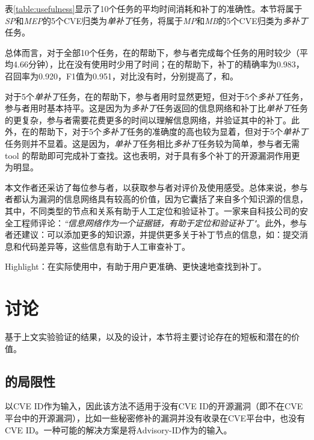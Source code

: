 表\ref{table:usefulness}显示了10个任务的平均时间消耗和补丁的准确性。本节将属于\textit{SP}和\textit{MEP}的5个CVE归类为\textit{单补丁}任务，将属于\textit{MP}和\textit{MB}的5个CVE归类为\textit{多补丁}任务。

总体而言，对于全部10个任务，在\tool 的帮助下，参与者完成每个任务的用时较少（平均4.66分钟），比在没有使用\tool 时少用了时间；在\tool 的帮助下，补丁的精确率为0.983，召回率为0.920，F1值为0.951，对比没有\tool 时，分别提高了，和。

对于5个\textit{单补丁}任务，在\tool 的帮助下，参与者用时显然更短，但对于5个\textit{多补丁}任务，参与者用时基本持平。这是因为\tool 为\textit{多补丁}任务返回的信息网络和补丁比\textit{单补丁}任务的更复杂，参与者需要花费更多的时间以理解信息网络，并验证其中的补丁。此外，在\tool 的帮助下，对于5个\textit{多补丁}任务的准确度的高也较为显着，但对于5个\textit{单补丁}任务则并不显着。这是因为，\textit{单补丁}任务相比\textit{多补丁}任务较为简单，参与者无需tool 的帮助即可完成补丁查找。这也表明，\tool 对于具有多个补丁的开源漏洞作用更为明显。

本文作者还采访了每位参与者，以获取参与者对\tool 评价及使用感受。总体来说，参与者都认为漏洞的信息网络具有较高的价值，因为它囊括了来自多个知识源的信息，其中，不同类型的节点和关系有助于人工定位和验证补丁。一家来自科技公司的安全工程师评论：\textit{``信息网络作为一个证据链，有助于定位和验证补丁"}。此外，参与者还建议：\tool 可以添加更多的知识源，并提供更多关于补丁节点的信息，如：提交消息和代码差异等，这些信息有助于人工审查补丁。

\begin{tcolorbox}[size=title,opacityfill=0.15]
Highlight：在实际使用中，\tool 有助于用户更准确、更快速地查找到补丁。
\end{tcolorbox}

\section{讨论}

基于上文实验验证的结果，以及\tool 的设计，本节将主要讨论\tool 存在的短板和潜在的价值。
\subsection{\tool 的局限性}
\tool 以CVE ID作为输入，因此该方法不适用于没有CVE ID的开源漏洞（即不在CVE平台中的开源漏洞），比如一些秘密修补的漏洞并没有收录在CVE平台中，也没有CVE ID。一种可能的解决方案是将Advisory-ID作为\tool 的输入。

